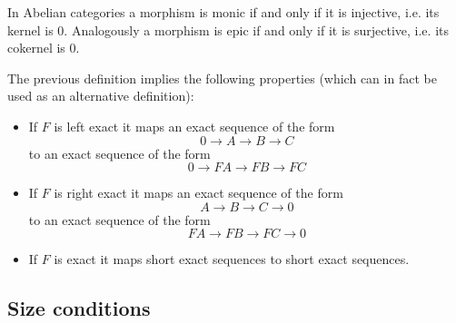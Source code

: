 	
	\begin{property}
		In Abelian categories a morphism is monic if and only if it is injective, i.e. its kernel is 0. Analogously a morphism is epic if and only if it is surjective, i.e. its cokernel is 0.
	\end{property}

	\begin{result}
		The previous definition implies the following properties (which can in fact be used as an alternative definition):
		\begin{itemize}
			\item If $F$ is left exact it maps an exact sequence of the form \[0\longrightarrow A\longrightarrow B\longrightarrow C\]
			to an exact sequence of the form \[0\longrightarrow FA\longrightarrow FB\longrightarrow FC\]
			\item If $F$ is right exact it maps an exact sequence of the form \[A\longrightarrow B\longrightarrow C\longrightarrow 0\]
			to an exact sequence of the form \[FA\longrightarrow FB\longrightarrow FC\longrightarrow 0\]
			\item If $F$ is exact it maps short exact sequences to short exact sequences.
		\end{itemize}
	\end{result}

\subsection{Size conditions}

